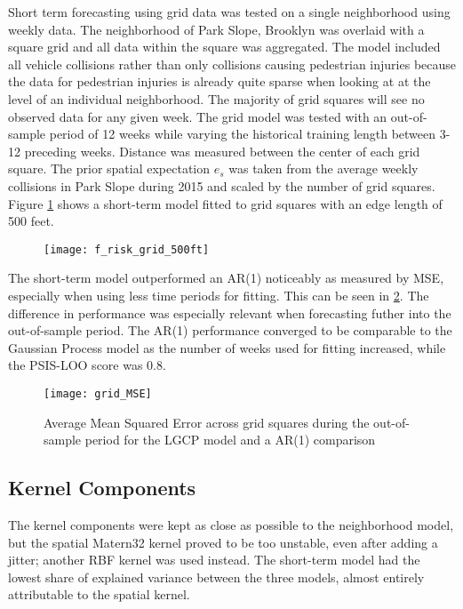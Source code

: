 Short term forecasting using grid data was tested on a single neighborhood using weekly data. The neighborhood of Park Slope, Brooklyn was overlaid with a square grid and all data within the square was aggregated. The model included all vehicle collisions rather than only collisions causing pedestrian injuries because the data for pedestrian injuries is already quite sparse when looking at at the level of an individual neighborhood. The majority of grid squares will see no observed data for any given week. The grid model was tested with an out-of-sample period of 12 weeks while varying the historical training length between 3-12 preceding weeks. Distance was measured between the center of each grid square. The prior spatial expectation $e_s$ was taken from the average weekly collisions in Park Slope during 2015 and scaled by the number of grid squares. Figure \ref{f_risk_grid_500ft} shows a short-term model fitted to grid squares with an edge length of 500 feet. \par


\begin{figure}[h!]
  \centering
  \caption{}
  \label{f_risk_grid_500ft}
  \texttt{[image: f\_risk\_grid\_500ft]}
\end{figure}

The short-term model outperformed an AR(1) noticeably as measured by MSE, especially when using less time periods for fitting. This can be seen in \ref{grid_MSE}. The difference in performance was especially relevant when forecasting futher into the out-of-sample period. The AR(1) performance converged to be comparable to the Gaussian Process model as the number of weeks used for fitting increased, while the PSIS-LOO score was 0.8. \par

\begin{figure}[]
  \centering
  \caption{Average Mean Squared Error across grid squares during the out-of-sample period for the LGCP model and a AR(1) comparison}
  \label{grid_MSE}
  \texttt{[image: grid\_MSE]}
\end{figure}


\subsection{Kernel Components}

The kernel components were kept as close as possible to the neighborhood model, but the spatial Matern32 kernel proved to be too unstable, even after adding a jitter; another RBF kernel was used instead. The short-term model had the lowest share of explained variance between the three models, almost entirely attributable to the spatial kernel. \par

